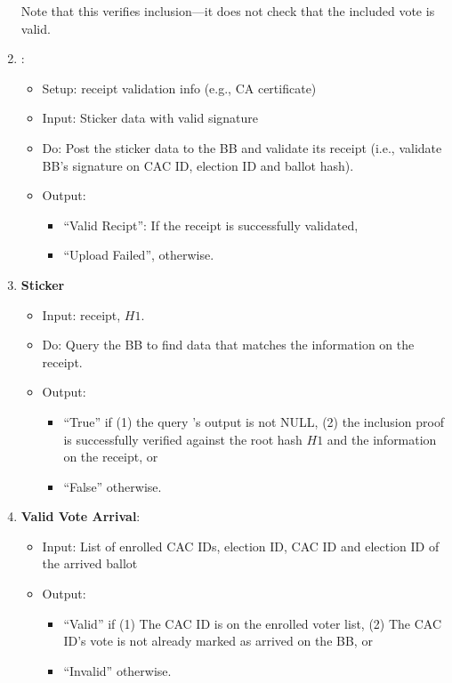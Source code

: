 \documentclass{article}
\begin{document}
\begin{enumerate}
\begin{itemize}
\end{itemize}
    Note that this verifies inclusion---it does not check that the included vote is valid.

\label{Vote BB presence-BB Inc}
    \item \textbf{\StickerBBUpload{}}:
\begin{itemize}
    \item Setup: receipt validation info (e.g., CA certificate)
    \item Input: Sticker data with valid signature
    \item Do: Post the sticker data to the BB and validate its receipt (i.e., validate BB's signature on CAC ID, election ID and ballot hash).
    \item Output: 
    \begin{itemize}
        \item ``Valid Recipt'': If the receipt is successfully validated,
        \item ``Upload Failed'', otherwise.
    \end{itemize}
\end{itemize}
\label{Vote BB presence-upload}

    \item \textbf{Sticker \BBInclusionCheck{}}
    \begin{itemize}
        \item Input: receipt, $H1$.
        \item Do: Query the BB  to find data that matches the information on the receipt.
        \item Output: 
        \begin{itemize}
            \item ``True'' if (1) the query 's output is not NULL, (2) the inclusion proof is successfully verified against the root hash $H1$ and the information on the receipt, or
            \item ``False'' otherwise.
        \end{itemize}
    \end{itemize}
\label{sticker inclusion check}
    \item \textbf{Valid Vote Arrival}:
\begin{itemize}
    \item Input: List of enrolled CAC IDs, election ID, CAC ID and election ID of the arrived ballot
    \item Output: 
    \begin{itemize}
        \item ``Valid'' if     (1) The CAC ID is on the enrolled voter list, (2) The CAC ID's vote is not already marked as arrived on the BB, or
        \item ``Invalid'' otherwise.


\end{itemize}
\end{itemize}
\end{enumerate}
\end{document}
